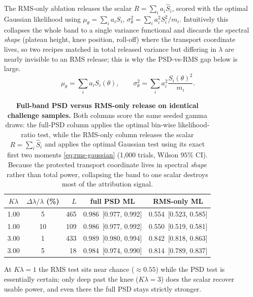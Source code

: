 \documentclass[11pt]{article}
\begin{document}
The RMS-only ablation releases the scalar \(R=\sum_i a_i\widehat S_i\), scored with the optimal Gaussian likelihood using \(\mu_\theta=\sum_ia_iS_i\), \(\sigma_\theta^2=\sum_ia_i^2S_i^2/m_i\). Intuitively this collapses the whole band to a single variance functional and discards the spectral \emph{shape} (plateau height, knee position, roll-off) where the transport coordinate lives, so two recipes matched in total released variance but differing in \(\lambda\) are nearly invisible to an RMS release; this is why the PSD-vs-RMS gap below is large.
\begin{equation}
\mu_\theta=\sum_i a_iS_i(\theta),\qquad \sigma_\theta^2=\sum_i a_i^2\frac{S_i(\theta)^2}{m_i}.
\label{eq:rms-gaussian}
\end{equation}

\begin{table}[htbp]
\centering
\small
\renewcommand{\arraystretch}{1.15}
\caption{\textbf{Full-band PSD versus RMS-only release on identical challenge samples.} Both columns score the same seeded gamma draws: the full-PSD column applies the optimal bin-wise likelihood-ratio test, while the RMS-only column releases the scalar $R=\sum_i\widehat S_i$ and applies the optimal Gaussian test using its exact first two moments \eqref{eq:rms-gaussian} (1,000 trials, Wilson $95\%$ CI). Because the protected transport coordinate lives in spectral \emph{shape} rather than total power, collapsing the band to one scalar destroys most of the attribution signal.}
\label{tab:rms-ablation}
\setlength{\tabcolsep}{6pt}
\begin{tabular}{c c r c c}
\toprule
{$K\lambda$} & {$\Delta\lambda/\lambda$ (\%)} & {$L$} & {full PSD ML} & {RMS-only ML} \\
\midrule
1.00 & 5 & 465 & 0.986~{\footnotesize [0.977, 0.992]} & 0.554~{\footnotesize [0.523, 0.585]} \\
1.00 & 10 & 109 & 0.986~{\footnotesize [0.977, 0.992]} & 0.550~{\footnotesize [0.519, 0.581]} \\
3.00 & 1 & 433 & 0.989~{\footnotesize [0.980, 0.994]} & 0.842~{\footnotesize [0.818, 0.863]} \\
3.00 & 5 & 18 & 0.984~{\footnotesize [0.974, 0.990]} & 0.814~{\footnotesize [0.789, 0.837]} \\
\bottomrule
\end{tabular}
\par\vspace{3pt}
\begin{minipage}{0.92\linewidth}\footnotesize At $K\lambda=1$ the RMS test sits near chance ($\approx0.55$) while the PSD test is essentially certain; only deep past the knee ($K\lambda=3$) does the scalar recover usable power, and even there the full PSD stays strictly stronger.\end{minipage}
\end{table}
\end{document}
